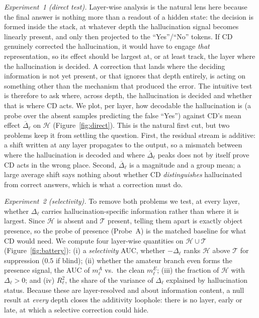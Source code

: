 \documentclass[11pt]{article}
\begin{document}
\emph{Experiment~1 (direct test).} Layer-wise analysis is the natural lens here
because the final answer is nothing more than a readout of a hidden state: the
decision is formed inside the stack, at whatever depth the hallucination signal
becomes linearly present, and only then projected to the ``Yes''/``No'' tokens. If CD
genuinely corrected the hallucination, it would have to engage \emph{that}
representation, so its effect should be largest at, or at least track, the layer where
the hallucination is decided. A correction that lands where the deciding information
is not yet present, or that ignores that depth entirely, is acting on something other
than the mechanism that produced the error. The intuitive test is therefore to ask
where, across depth, the hallucination is decided and whether that is where CD acts.
We plot, per layer, how decodable the hallucination is (a probe over the absent
samples predicting the false ``Yes'') against CD's mean effect $\overline{\Delta}_\ell$
on $\mathcal{H}$ (Figure~\ref{fig:direct}). This is the natural first cut, but two problems keep it
from settling the question. First, the residual stream is additive: a shift written
at any layer propagates to the output, so a mismatch between where the hallucination
is decoded and where $\overline{\Delta}_\ell$ peaks does not by itself prove CD acts
in the wrong place. Second, $\overline{\Delta}_\ell$ is a magnitude and a group mean;
a large average shift says nothing about whether CD \emph{distinguishes} hallucinated
from correct answers, which is what a correction must do.

\emph{Experiment~2 (selectivity).} To remove both problems we test, at every layer,
whether $\Delta_\ell$ carries hallucination-specific information rather than where it
is largest. Since $\mathcal{H}$ is absent and $\mathcal{T}$ present, telling them
apart is exactly object presence, so the probe of presence (Probe~A) is the matched
baseline for what CD would need. We compute four layer-wise quantities on
$\mathcal{H}\cup\mathcal{T}$ (Figure~\ref{fig:battery}): (i) a \emph{selectivity}
AUC, whether $-\Delta_\ell$ ranks $\mathcal{H}$ above $\mathcal{T}$ for suppression
($0.5$ if blind); (ii) whether the amateur branch even forms the presence signal,
the AUC of $m^{A}_\ell$ vs.\ the clean $m^{E}_\ell$; (iii) the fraction of
$\mathcal{H}$ with $\Delta_\ell>0$; and (iv) $R^2_\ell$, the share of the variance of
$\Delta_\ell$ explained by hallucination status. Because these are layer-resolved and
about information content, a null result at \emph{every} depth closes the additivity
loophole: there is no layer, early or late, at which a selective correction could
hide.
\end{document}
